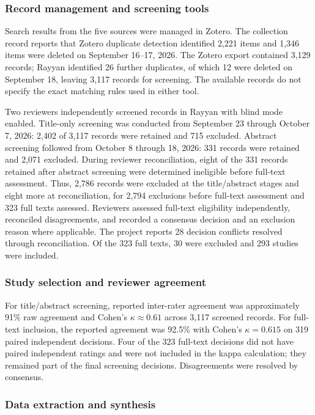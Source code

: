 \documentclass[journal]{IEEEtran}
\begin{document}
\subsubsection{Record management and screening tools}
\label{subsec:tools}

Search results from the five sources were managed in Zotero. The collection record reports that Zotero duplicate detection identified 2,221 items and 1,346 items were deleted on September 16--17, 2026. The Zotero export contained 3,129 records; Rayyan identified 26 further duplicates, of which 12 were deleted on September 18, leaving 3,117 records for screening. The available records do not specify the exact matching rules used in either tool.

Two reviewers independently screened records in Rayyan with blind mode enabled. Title-only screening was conducted from September 23 through October 7, 2026: 2,402 of 3,117 records were retained and 715 excluded. Abstract screening followed from October 8 through 18, 2026: 331 records were retained and 2,071 excluded. During reviewer reconciliation, eight of the 331 records retained after abstract screening were determined ineligible before full-text assessment. Thus, 2,786 records were excluded at the title/abstract stages and eight more at reconciliation, for 2,794 exclusions before full-text assessment and 323 full texts assessed. Reviewers assessed full-text eligibility independently, reconciled disagreements, and recorded a consensus decision and an exclusion reason where applicable. The project reports 28 decision conflicts resolved through reconciliation. Of the 323 full texts, 30 were excluded and 293 studies were included.

\subsubsection{Study selection and reviewer agreement}
\label{subsec:screening}

For title/abstract screening, reported inter-rater agreement was approximately 91\% raw agreement and Cohen's $\kappa\approx0.61$ across 3,117 screened records. For full-text inclusion, the reported agreement was 92.5\% with Cohen's $\kappa=0.615$ on 319 paired independent decisions. Four of the 323 full-text decisions did not have paired independent ratings and were not included in the kappa calculation; they remained part of the final screening decisions. Disagreements were resolved by consensus.

\subsubsection{Data extraction and synthesis}
\label{subsec:extraction}
\end{document}
